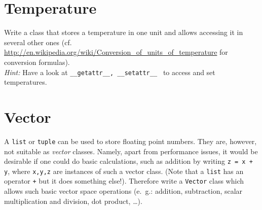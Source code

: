 \documentclass[12pt]{scrartcl}
\begin{document}

\section{Temperature}

Write a class that stores a temperature in one unit and allows accessing it in
several other ones
(cf. \url{http://en.wikipedia.org/wiki/Conversion_of_units_of_temperature} for
conversion formulas).\\
\emph{Hint:} Have a look at \texttt{\_\_getattr\_\_, \_\_setattr\_\_ } to
access and set temperatures.

\section{Vector}

A \texttt{list} or \texttt{tuple} can be used to store floating point numbers. They are, however, not suitable as \emph{vector} classes. Namely, apart from performance issues, it would be desirable if one could do basic calculations, such as addition by writing \texttt{z = x + y}, where \texttt{x,y,z} are instances of such a vector class. (Note that a \texttt{list} has an operator \texttt{+} but it does something else!). Therefore write a \texttt{Vector} class which allows such basic vector space operations (e.\ g.: addition, subtraction, scalar multiplication and division, dot product, \dots).
\end{document}
